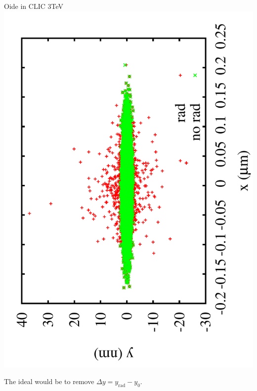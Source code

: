 \documentclass{beamer}
\begin{document}
\begin{frame}{Oide in CLIC 3TeV}
 \includegraphics[scale=0.2,angle=-90]{plotxyrad.pdf}\par
 The ideal would be to remove $\Delta y = y_\text{rad} -y_0$.\par
\end{frame}
\end{document}
